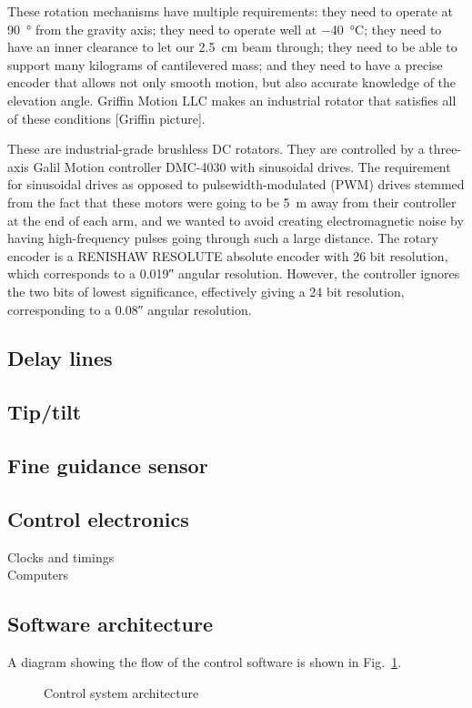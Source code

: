 These rotation mechanisms have multiple requirements: they need to operate at \SI{90}{\degree} from the gravity axis; they need to operate well at \SI{-40}{\celsius}; they need to have an inner clearance to let our \SI{2.5}{\cm} beam through; they need to be able to support many kilograms of cantilevered mass; and they need to have a precise encoder that allows not only smooth motion, but also accurate knowledge of the elevation angle. Griffin Motion LLC makes an industrial rotator that satisfies all of these conditions [Griffin picture].

These are industrial-grade brushless DC rotators. They are controlled by a three-axis Galil Motion controller DMC-4030 with sinusoidal drives. The requirement for sinusoidal drives as opposed to pulsewidth-modulated (PWM) drives stemmed from the fact that these motors were going to be \SI{5}{\meter} away from their controller at the end of each arm, and we wanted to avoid creating electromagnetic noise by having high-frequency pulses going through such a large distance. The rotary encoder is a RENISHAW RESOLUTE absolute encoder with 26 bit resolution, which corresponds to a \ang{;;0.019} angular resolution. However, the controller ignores the two bits of lowest significance, effectively giving a 24 bit resolution, corresponding to a \ang{;;0.08} angular resolution.


\subsection{Delay lines}
\subsection{Tip/tilt}



\subsection{Fine guidance sensor}


\subsection{Control electronics}
Clocks and timings \\
Computers
\subsection{Software architecture}

A diagram showing the flow of the control software is shown in Fig.~\ref{fig:ControlSystem}. 
\begin{figure}[!ht]
	\centering
	
	\caption[Control System Design]{Control system architecture}
	\label{fig:ControlSystem}
    \end{figure}

